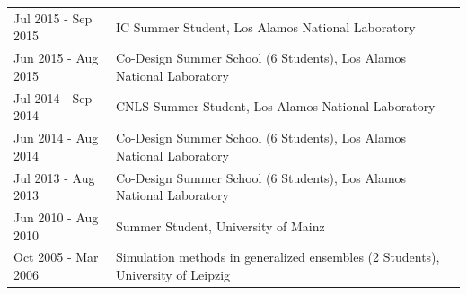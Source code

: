 \documentclass{article}
\begin{document}
\begin{longtable}{p{}p{}}
Jul 2015 - Sep 2015 & IC Summer Student, Los Alamos National Laboratory \\
Jun 2015 - Aug 2015 & Co-Design Summer School (6 Students), Los Alamos National Laboratory \\
Jul 2014 - Sep 2014 & CNLS Summer Student, Los Alamos National Laboratory \\
Jun 2014 - Aug 2014 & Co-Design Summer School (6 Students), Los Alamos National Laboratory \\
Jul 2013 - Aug 2013 & Co-Design Summer School (6 Students), Los Alamos National Laboratory \\
Jun 2010 - Aug 2010 & Summer Student, University of Mainz \\
Oct 2005 - Mar 2006 & Simulation methods in generalized ensembles (2 Students), University of Leipzig \\
\end{longtable}

\newpage
%
%
%
\end{document}
